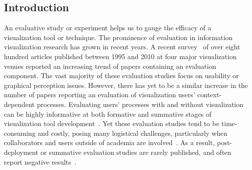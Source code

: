 \subsection{Introduction}
\label{app:overview:prelim-intro}

An evaluative study or experiment helps us to gauge the efficacy of a visualization tool or technique.
The prominence of evaluation in information visualization research has grown in recent years. 
A recent survey~\cite{Lam2012} of over eight hundred articles published between 1995 and 2010 at four major visualization venues reported an increasing trend of papers containing an evaluation component. 
The vast majority of these evaluation studies focus on usability or graphical perception issues. 
However, there has yet to be a similar increase in the number of papers reporting an evaluation of visualization users' context-dependent processes.
Evaluating users' processes with and without visualization can be highly informative at both formative and summative stages of visualization tool development~\cite{Andrews2008,Ellis2006}. 
Yet these evaluation studies tend to be time-consuming and costly, posing many logistical challenges, particularly when collaborators and users outside of academia are involved~\cite{Sedlmair2011}. 
As a result, post-deployment or summative evaluation studies are rarely published, and often report negative results~\cite{Gonzalez2003a,Munzner2011a}.

